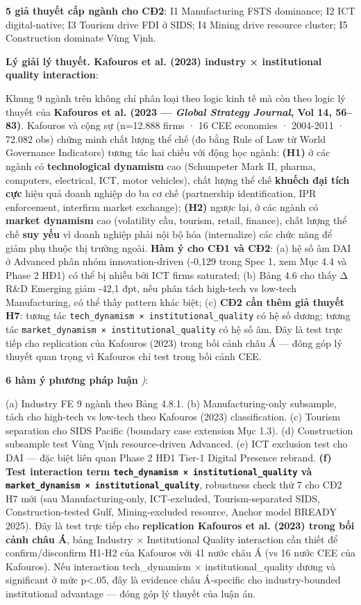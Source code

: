 \documentclass[12pt,a4paper]{article}
\begin{document}
\textbf{5 giả thuyết cấp ngành cho CĐ2}: I1 Manufacturing FSTS
dominance; I2 ICT digital-native; I3 Tourism drive FDI ở SIDS; I4 Mining
drive resource cluster; I5 Construction dominate Vùng Vịnh.

\textbf{Lý giải lý thuyết. Kafouros et al. (2023) industry ×
institutional quality interaction}:

Khung 9 ngành trên không chỉ phân loại theo logic kinh tế mà còn theo
logic lý thuyết của \textbf{Kafouros et al. (2023 --- \emph{Global
Strategy Journal}, Vol 14, 56--83)}. Kafouros và cộng sự (n=12.888 firms
· 16 CEE economies · 2004-2011 · 72.082 obs) chứng minh chất lượng thể
chế (đo bằng Rule of Law từ World Governance Indicators) tương tác hai
chiều với động học ngành: \textbf{(H1)} ở các ngành có
\textbf{technological dynamism} cao (Schumpeter Mark II, pharma,
computers, electrical, ICT, motor vehicles), chất lượng thể chế
\textbf{khuếch đại tích cực} hiệu quả doanh nghiệp do ba cơ chế
(partnership identification, IPR enforcement, interfirm market
exchange); \textbf{(H2)} ngược lại, ở các ngành có \textbf{market
dynamism} cao (volatility cầu, tourism, retail, finance), chất lượng thể
chế \textbf{suy yếu} vì doanh nghiệp phải nội bộ hóa (internalize) các
chức năng để giảm phụ thuộc thị trường ngoài. \textbf{Hàm ý cho CĐ1 và
CĐ2}: (a) hệ số âm DAI ở Advanced phân nhóm innovation-driven (-0,129
trong Spec 1, xem Mục 4.4 và Phase 2 HĐ1) có thể bị nhiễu bởi ICT firms
saturated; (b) Bảng 4.6 cho thấy Δ R\&D Emerging giảm -42,1 đpt, nếu
phân tách high-tech vs low-tech Manufacturing, có thể thấy pattern khác
biệt; (c) \textbf{CĐ2 cần thêm giả thuyết H7}: tương tác
\texttt{tech\_dynamism\ ×\ institutional\_quality} có hệ số dương; tương
tác \texttt{market\_dynamism\ ×\ institutional\_quality} có hệ số âm.
Đây là test trực tiếp cho replication của Kafouros (2023) trong bối cảnh
châu Á --- đóng góp lý thuyết quan trọng vì Kafouros chỉ test trong bối
cảnh CEE.

\textbf{6 hàm ý phương pháp luận} \emph{)}:

(a) Industry FE 9 ngành theo Bảng 4.8.1. (b) Manufacturing-only
subsample, tách cho high-tech vs low-tech theo Kafouros (2023)
classification. (c) Tourism separation cho SIDS Pacific (boundary case
extension Mục 1.3). (d) Construction subsample test Vùng Vịnh
resource-driven Advanced. (e) ICT exclusion test cho DAI --- đặc biệt
liên quan Phase 2 HĐ1 Tier-1 Digital Presence rebrand. \textbf{(f) Test
interaction term \texttt{tech\_dynamism\ ×\ institutional\_quality} và
\texttt{market\_dynamism\ ×\ institutional\_quality}}, robustness check
thứ 7 cho CĐ2 H7 mới (sau Manufacturing-only, ICT-excluded,
Tourism-separated SIDS, Construction-tested Gulf, Mining-excluded
resource, Anchor model BREADY 2025). Đây là test trực tiếp cho
\textbf{replication Kafouros et al. (2023) trong bối cảnh châu Á}, bảng
Industry × Institutional Quality interaction cần thiết để
confirm/disconfirm H1-H2 của Kafouros với 41 nước châu Á (vs 16 nước CEE
của Kafouros). Nếu interaction tech\_dynamism × institutional\_quality
dương và significant ở mức p\textless.05, đây là evidence châu
Á-specific cho industry-bounded institutional advantage --- đóng góp lý
thuyết của luận án.
\end{document}
